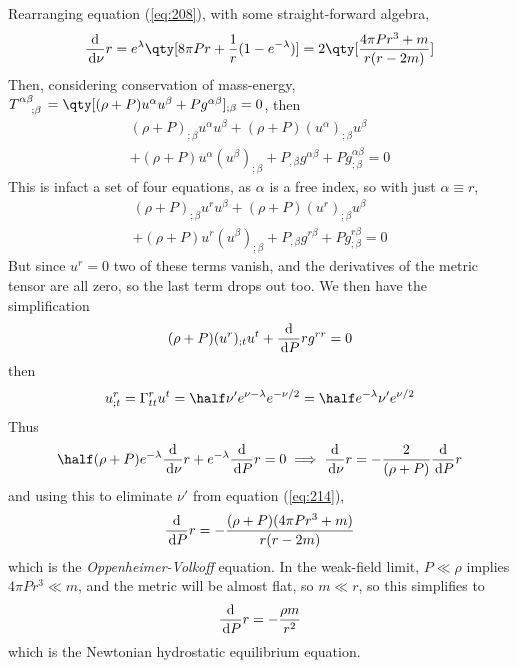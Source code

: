 Rearranging equation (\ref{eq:208}), with some straight-forward
algebra,
\begin{equation}
  \label{eq:214}
  \dv{\nu}{r} = e^{\lambda} \qty[8 \pi P r + \frac{1}{r} (1-e^{-\lambda})] = 2 \qty[\frac{4 \pi P r^3 + m}{r(r-2m)}]
\end{equation}
Then, considering conservation of mass-energy, $\tensor{T}{^{\alpha
    \beta}_{;\beta}} = \qty[(\rho +P) u^{\alpha}u^{\beta} + P
g^{\alpha \beta}]_{;\beta}= 0$, then
\begin{equation}
  \label{eq:215}
\begin{split}
  (\rho + P)_{;\beta} u^{\alpha} u^{\beta} + (\rho+P)(u^{\alpha})_{; \beta} u^{\beta} \\ + (\rho+P) u^{\alpha}(u^{\beta})_{; \beta} + P_{,\beta} g^{\alpha \beta} + Pg^{\alpha \beta}_{; \beta} = 0
\end{split}
\end{equation}
This is infact a set of four equations, as $\alpha$ is a free index,
so with just $\alpha \equiv r$,
\begin{equation}
  \label{eq:215}
\begin{split}
  (\rho + P)_{;\beta} u^{r} u^{\beta} + (\rho+P)(u^{r})_{; \beta} u^{\beta} \\ + (\rho+P) u^{r}(u^{\beta})_{; \beta} + P_{,\beta} g^{r \beta} + Pg^{r \beta}_{; \beta} = 0
\end{split}
\end{equation}
But since $u^r=0$ two of these terms vanish, and the derivatives of
the metric tensor are all zero, so the last term drops out too. We
then have the simplification
\begin{equation}
  \label{eq:216}
  ( \rho +P)(u^r)_{;t} u^t + \frac{\mathrm{d}}{\,\mathrm{d} P}{r} g^{rr} = 0
\end{equation}
then
\begin{equation}
  \label{eq:217}
  u^r_{;t} = \Gamma^r_{tt} u^t = \half \nu' e^{\nu-\lambda} e^{-\nu/2} = \half e^{-\lambda} \nu' e^{\nu/2}
\end{equation}
Thus
\begin{equation}
  \label{eq:218}
  \half(\rho + P) e^{-\lambda} \dv{\nu}{r} + e^{- \lambda} \dv{P}{r} = 0 \implies \dv{\nu}{r} = - \frac{2}{(\rho+P)} \dv{P}{r}
\end{equation}
and using this to eliminate $\nu'$ from equation (\ref{eq:214}),
\begin{equation}
  \label{eq:219}
  \frac{\mathrm{d}}{\,\mathrm{d} P}{r} = - \frac{(\rho + P)(4 \pi P r^3 + m)}{r(r-2m)}
\end{equation}
which is the \emph{Oppenheimer-Volkoff} equation. In the weak-field limit, $P \ll \rho$ implies $4 \pi P r^3 \ll m$, and the metric will be almost flat, so $m \ll r$, so this simplifies to
\begin{equation}
  \label{eq:220}
  \frac{\mathrm{d}}{\,\mathrm{d} P}{r} = - \frac{\rho m}{r^2}
\end{equation}
which is the Newtonian hydrostatic equilibrium equation.

